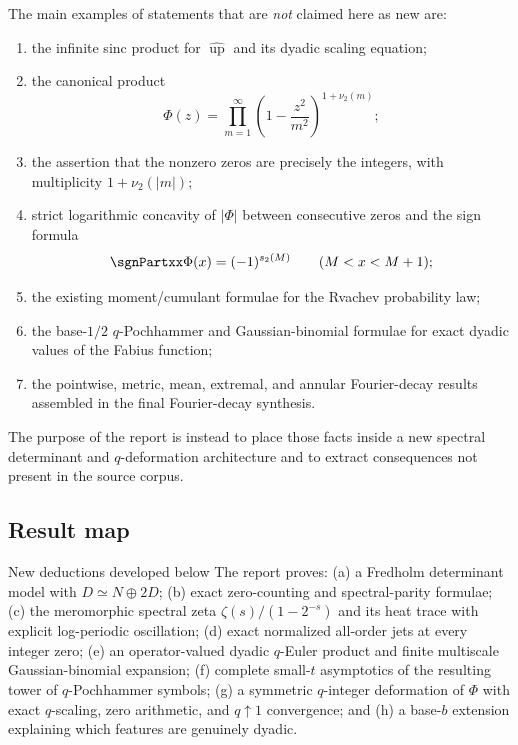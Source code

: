 \documentclass[11pt]{article}
\numberwithin{equation}{section}
\theoremstyle{definition}
\theoremstyle{remark}
\newcommand{\Up}{\operatorname{up}}
\begin{document}
The main examples of statements that are \emph{not} claimed here as new are:
\begin{enumerate}[label=(\roman*),leftmargin=2.1em]
\item the infinite sinc product for $\widehat{\Up}$ and its dyadic scaling equation;
\item the canonical product
\[
 \Phi(z)=\prod_{m=1}^{\infty}\left(1-\frac{z^2}{m^2}\right)^{1+\nu_2(m)};
\]
\item the assertion that the nonzero zeros are precisely the integers, with multiplicity $1+\nu_2(|m|)$;
\item strict logarithmic concavity of $|\Phi|$ between consecutive zeros and the sign formula
\[
 \sgnPartxx\Phi(x)=(-1)^{s_2(M)}\qquad(M<x<M+1);
\]
\item the existing moment/cumulant formulae for the Rvachev probability law;
\item the base-$1/2$ $q$-Pochhammer and Gaussian-binomial formulae for exact dyadic values of the Fabius function;
\item the pointwise, metric, mean, extremal, and annular Fourier-decay results assembled in the final Fourier-decay synthesis.
\end{enumerate}

The purpose of the report is instead to place those facts inside a new spectral determinant and $q$-deformation architecture and to extract consequences not present in the source corpus.

\subsection{Result map}

\begin{resultboxPartxx}{New deductions developed below}
The report proves: (a) a Fredholm determinant model with $D\simeq N\oplus2D$; (b) exact zero-counting and spectral-parity formulae; (c) the meromorphic spectral zeta $\zeta(s)/(1-2^{-s})$ and its heat trace with explicit log-periodic oscillation; (d) exact normalized all-order jets at every integer zero; (e) an operator-valued dyadic $q$-Euler product and finite multiscale Gaussian-binomial expansion; (f) complete small-$t$ asymptotics of the resulting tower of $q$-Pochhammer symbols; (g) a symmetric $q$-integer deformation of $\Phi$ with exact $q$-scaling, zero arithmetic, and $q\uparrow1$ convergence; and (h) a base-$b$ extension explaining which features are genuinely dyadic.
\end{resultboxPartxx}
\end{document}
